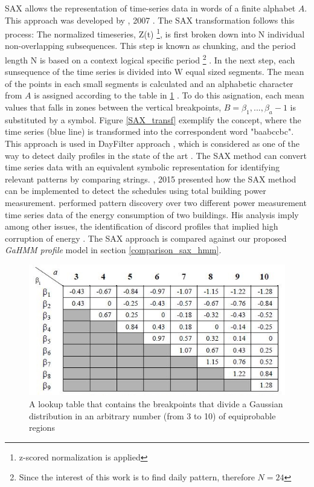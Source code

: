 SAX allows the representation of time-series data in words of a finite alphabet $A$. This approach was developed by \citeauthor{keogh2005hot}, 2007 \cite{lin2007experiencing,butler2015sax,keogh2005hot}. The SAX transformation follows this process: The normalized timeseries, Z(t) \footnote{z-scored normalization is applied}, is first broken down into N individual non-overlapping subsequences. This step is known as chunking, and the period length N  is based on a context logical specific period \footnote{Since the interest of this work is to find daily pattern, therefore $N=24$} \cite{lin2007experiencing}. In the next step, each sunsequence of the time series is divided into W equal sized segments. The mean of the points in each small segments is calculated and an alphabetic character from $A$ is assigned according to the table in \ref{table_sax} \cite{lin2007experiencing}. To do this asignation, each mean values that falls in zones between the vertical breakpoints, $B= \beta_1,..., \beta_a - 1$ is substituted by a symbol. Figure \ref{SAX_transf} \cite{lin2007experiencing} exemplify the concept, where the time series (blue line) is transformed into the correspondent word "baabccbc". This approach is used in DayFilter approach \cite{miller2015automated}, which is considered as one of the way to detect daily profiles in the state of the art \cite{kim2017review}. The SAX method can convert time series data with an equivalent symbolic representation for identifying relevant patterns by comparing strings. \citeauthor{miller2015automated}, 2015 \cite{miller2015automated} presented how the SAX method can be implemented to detect the schedules using total building power measurement. \citeauthor{miller2015automated} performed pattern discovery over two different power measurement time series data of the energy consumption of two buildings. His analysis imply among other issues, the identification of discord profiles that implied high corruption of energy \cite{kim2017review, miller2015automated}. The SAX approach is compared against our proposed \textit{GaHMM profile} model in section \ref{comparison_sax_hmm}.


\begin{figure}[h!]
  \vspace{0.5em} %
  \includegraphics[scale=0.7]{Figures/table_sax.jpg}
  \caption[description]{A lookup table that contains the breakpoints that
divide a Gaussian distribution in an arbitrary number (from 3
to 10) of equiprobable regions}
  \label{table_sax}
\end{figure}

